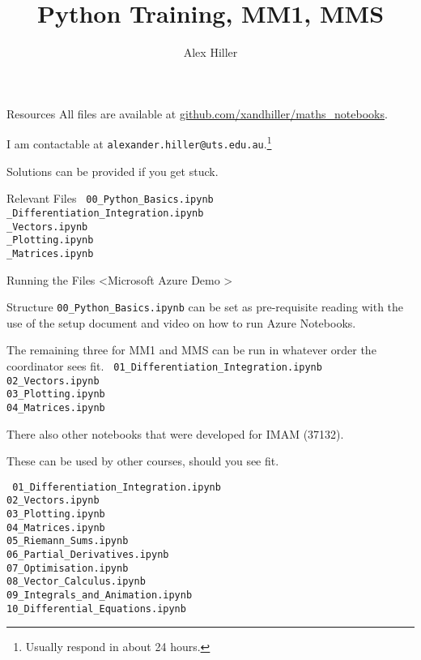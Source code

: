 \documentclass{beamer}
\author{Alex Hiller}
\title{Python Training, MM1, MMS}
\begin{document}
\begin{frame}
  \maketitle
\end{frame}

\begin{frame}{Resources}
    All files are available at \url{github.com/xandhiller/maths_notebooks}. \par \pause
    I am contactable at \texttt{alexander.hiller@uts.edu.au}.\footnote{Usually respond in about 24 hours.} \par \pause
    Solutions can be provided if you get stuck. 
\end{frame}

\begin{frame}{Relevant Files}
\texttt{%
00\_Python\_Basics.ipynb  \\ \_Differentiation\_Integration.ipynb \\ \_Vectors.ipynb \\ \_Plotting.ipynb \\ \_Matrices.ipynb }
\end{frame}
\begin{frame}{Running the Files}
    \textless Microsoft Azure Demo \textgreater
\end{frame}
\begin{frame}{Structure}
    \texttt{00\_Python\_Basics.ipynb} can be set as pre-requisite reading with the use of the setup document and video on how to run Azure Notebooks. \pause \par
    The remaining three for MM1 and MMS can be run in whatever order the coordinator sees fit. \pause
    \texttt{%
    01\_Differentiation\_Integration.ipynb \\ 
    02\_Vectors.ipynb \\ 
    03\_Plotting.ipynb \\ 
    04\_Matrices.ipynb }
\end{frame}
\begin{frame}
    There also other notebooks that were developed for IMAM (37132). \par \pause
    These can be used by other courses, should you see fit. \par \pause
    \texttt{%
    01\_Differentiation\_Integration.ipynb \\ 
    02\_Vectors.ipynb \\ 
    03\_Plotting.ipynb \\ 
    04\_Matrices.ipynb \\
    05\_Riemann\_Sums.ipynb\\
    06\_Partial\_Derivatives.ipynb\\
    07\_Optimisation.ipynb\\
    08\_Vector\_Calculus.ipynb\\
    09\_Integrals\_and\_Animation.ipynb\\
    10\_Differential\_Equations.ipynb\\}
\end{frame}
\end{document}
